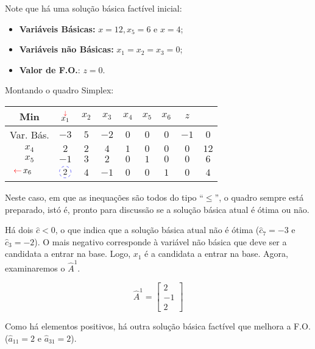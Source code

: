 Note que há uma solução básica factível inicial: 
\begin{itemize}
  \item \textbf{Variáveis Básicas:} $ x = 12, x_5 = 6 \text{ e } x = 4 $;
  \item \textbf{Variáveis não Básicas:} $ x_1 = x_2 = x_3 = 0$;
  \item \textbf{Valor de F.O.}: $ z = 0 $.
\end{itemize}

Montando o quadro Simplex:

\begin{table}[!htbp]
  \centering
  \begin{tabular}{c|ccccccc|c}
    Min             & $\stackrel{\textcolor{red}{\downarrow}}{x_{1}}$   & $x_2$ & $x_3$ & $x_4$ & $x_5$ & $x_6$ & $z$  &      \\ \hline
    Var. Bás.       & $-3$              & $5$   & $-2$  & $0$   & $0$   & $0$   & $-1$ & $0$  \\ \hline           
    $x_4$           & $ 2$              & $2$   & $4$   & $1$   & $0$   & $0$   & $0$  & $12$ \\
    $x_5$           & $-1$              & $3$   & $2$   & $0$   & $1$   & $0$   & $0$  & $6$  \\
    $\setaSai{6}$   & $\circulo{2}$     & $4$   & $-1$  & $0$   & $0$   & $1$   & $0$  & $4$
  \end{tabular}
\end{table}

Neste caso, em que as inequações são todos do tipo ``$\leq$'', o quadro sempre está
preparado, istó é, pronto para discussão se a solução  básica atual é ótima ou
não.

Há dois $\widehat{c} < 0$, o que indica que a solução básica atual não é ótima 
($\widehat{c}_7 = -3$ e $\widehat{c}_3 = -2$).
O mais negativo corresponde à variável não básica que deve ser a candidata a 
entrar na base.
Logo, $ x_1 $ é a candidata a entrar  na base.
Agora, examinaremos o $ \widehat{A}^{1} $.

\[
  \widehat{A}^{1} = 
    \begin{bmatrix}
      2 \\
      -1 \\
      2
    \end{bmatrix}
\]

Como há elementos positivos, há outra solução básica factível que melhora a F.O.
($\widehat{a}_{11} = 2$ e $\widehat{a}_{31} = 2$).

